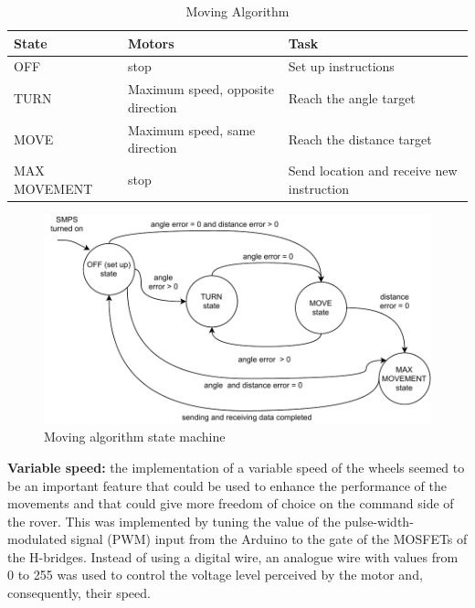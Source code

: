 \documentclass[10pt,twoside]{article}
\begin{document}
\begin{table}[hbt]
\centering
\renewcommand{\arraystretch}{1.3}
\begin{tabular}{@{}lll@{}}
\toprule
State & Motors                     & Task                               \\ \midrule
OFF            & stop                                & Set up   instructions                       \\
TURN           & Maximum speed,   opposite direction & Reach the   angle target                    \\
MOVE           & Maximum speed,   same direction     & Reach the   distance target                 \\
MAX MOVEMENT   & stop                                & Send location   and receive new instruction \\ \bottomrule
\end{tabular}
\caption{Moving Algorithm}
\end{table}
 
 \begin{figure}
     \centering
     \includegraphics{movestate.pdf}
     \caption{Moving algorithm state machine}
     \label{fig:my_label}
 \end{figure}
\textbf{Variable speed:} the implementation of a variable speed of the wheels seemed to be an important feature that could be used to enhance the performance of the movements and that could give more freedom of choice on the command side of the rover. This was implemented by tuning the value of the pulse-width-modulated signal (PWM) input from the Arduino to the gate of the MOSFETs of the H-bridges. Instead of using a digital wire, an analogue wire with values from 0 to 255 was used to control the voltage level perceived by the motor and, consequently, their speed. 
\end{document}
